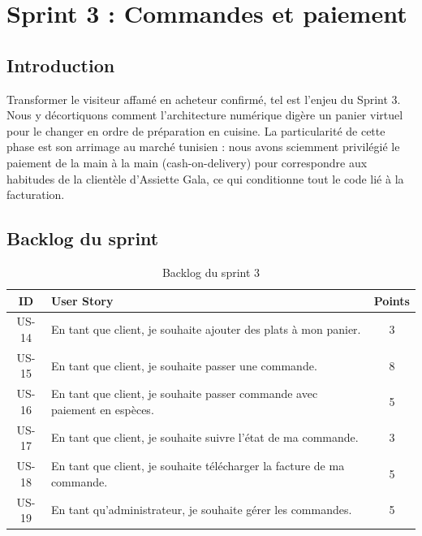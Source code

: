 \chapter{Sprint 3 : Commandes et paiement}

\section{Introduction}

Transformer le visiteur affamé en acheteur confirmé, tel est l'enjeu du Sprint 3. Nous y décortiquons comment l'architecture numérique digère un panier virtuel pour le changer en ordre de préparation en cuisine. La particularité de cette phase est son arrimage au marché tunisien : nous avons sciemment privilégié le paiement de la main à la main (cash-on-delivery) pour correspondre aux habitudes de la clientèle d'Assiette Gala, ce qui conditionne tout le code lié à la facturation.

\section{Backlog du sprint}

\begin{table}[H]
    \centering
    \caption{Backlog du sprint 3}
    \label{tab:backlog_sprint3}
    \renewcommand{\arraystretch}{1.3}
    \begin{tabular}{|c|p{8cm}|c|}
        \hline
        \textbf{ID} & \textbf{User Story} & \textbf{Points} \\
        \hline
        US-14 & En tant que client, je souhaite ajouter des plats à mon panier. & 3 \\
        \hline
        US-15 & En tant que client, je souhaite passer une commande. & 8 \\
        \hline
        US-16 & En tant que client, je souhaite passer commande avec paiement en espèces. & 5 \\
        \hline
        US-17 & En tant que client, je souhaite suivre l'état de ma commande. & 3 \\
        \hline
        US-18 & En tant que client, je souhaite télécharger la facture de ma commande. & 5 \\
        \hline
        US-19 & En tant qu'administrateur, je souhaite gérer les commandes. & 5 \\
        \hline
    \end{tabular}
\end{table}

